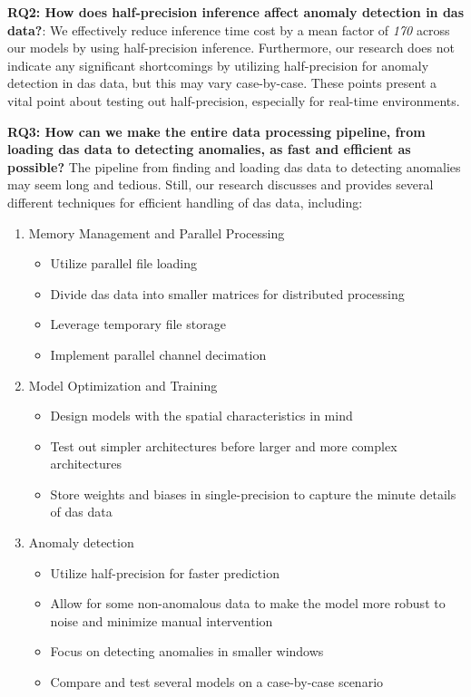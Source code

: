 \textbf{RQ2: How does half-precision inference affect anomaly detection in \acrshort{das} data?}:
 We effectively reduce inference time cost by a mean factor of \textit{170} across our models by using half-precision inference. Furthermore, our research does not indicate any significant shortcomings by utilizing half-precision for anomaly detection in \acrshort{das} data, but this may vary case-by-case. These points present a vital point about testing out half-precision, especially for real-time environments.

\textbf{RQ3: How can we make the entire data processing pipeline, from loading \acrshort{das} data to detecting anomalies, as fast and efficient as possible?} The pipeline from finding and loading \acrshort{das} data to detecting anomalies may seem long and tedious. Still, our research discusses and provides several different techniques for efficient handling of \acrshort{das} data, including:

\begin{enumerate}
    \item Memory Management and Parallel Processing
    \begin{itemize}
        \item Utilize parallel file loading
        \item Divide \acrshort{das} data into smaller matrices for distributed processing
        \item Leverage temporary file storage
        \item Implement parallel channel decimation
    \end{itemize}
    \item Model Optimization and Training
    \begin{itemize}
        \item Design models with the spatial characteristics in mind
        \item Test out simpler architectures before larger and more complex architectures
        \item Store weights and biases in single-precision to capture the minute details of \acrshort{das} data
    \end{itemize}
    \item Anomaly detection
    \begin{itemize}
        \item Utilize half-precision for faster prediction
        \item Allow for some non-anomalous data to make the model more robust to noise and minimize manual intervention
        \item Focus on detecting anomalies in smaller windows
        \item Compare and test several models on a case-by-case scenario
    \end{itemize}
\end{enumerate}


